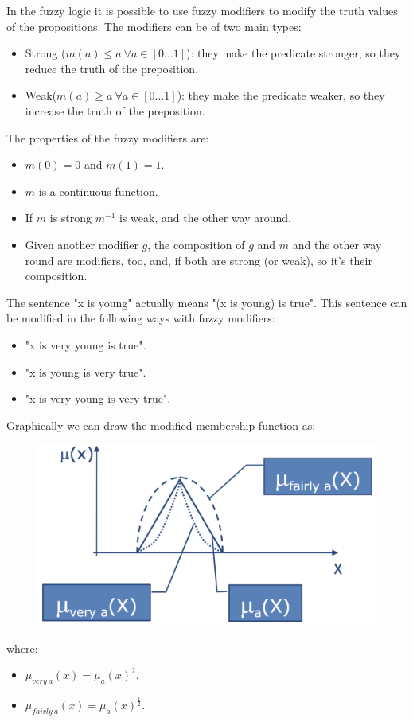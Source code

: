 \documentclass[12pt, a4paper]{report}
\newtheorem[L]{theorem}{Theorem}
\newtheorem[M]{corollary}{Corollary}
\newtheorem[M]{lemma}{Lemma}
\newtheorem[style=S,bodystyle=\normalfont]{definition}{Definition}
\begin{document}
    In the fuzzy logic it is possible to use fuzzy modifiers to modify the truth values of the propositions.     
    The modifiers can be of two main types: 
    \begin{itemize}
        \item Strong ($m(a) \leq a \: \forall a \in [0 \dots 1]$): they make the predicate stronger, so they reduce the truth of the preposition.
        \item Weak($m(a) \geq a \: \forall a \in [0 \dots 1]$): they make the predicate weaker, so they increase the truth of the preposition.
    \end{itemize}
    The properties of the fuzzy modifiers are:
    \begin{itemize}
        \item $m(0)=0$ and $m(1)=1$.
        \item $m$ is a continuous function. 
        \item If $m$ is strong $m^{-1}$ is weak, and the other way around.
        \item Given another modifier $g$, the composition of $g$ and $m$ and the other way round are modifiers, too, and, if both are strong
            (or weak), so it's their composition.
    \end{itemize}
    \begin{example}
        The sentence "x is young" actually means "(x is young) is true". This sentence can be modified in the following ways with fuzzy modifiers:
        \begin{itemize}
            \item "x is very young is true".
            \item "x is young is very true".
            \item "x is very young is very true". 
        \end{itemize}
        Graphically we can draw the modified membership function as: 
        \begin{figure}[H]
            \centering
            \includegraphics[width=0.4\linewidth]{images/modifiers.png}
        \end{figure}
        where: 
        \begin{itemize}
            \item $\mu_{very \: a}(x)=\mu_a(x)^2$.
            \item $\mu_{fairly \: a}(x)=\mu_a(x)^{\frac{1}{2}}$.
        \end{itemize}
    \end{example}
\end{document}
